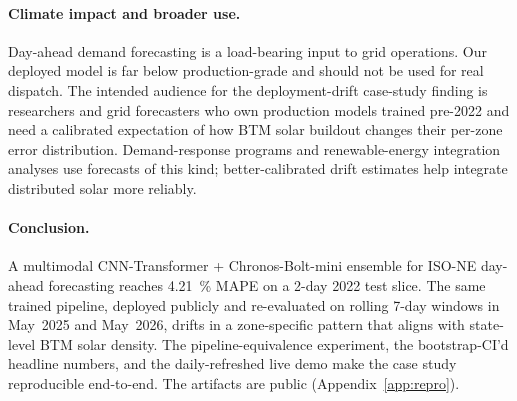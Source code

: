 \paragraph{Climate impact and broader use.}
Day-ahead demand forecasting is a load-bearing input to grid
operations. Our deployed model is far below production-grade and should
not be used for real dispatch. The intended audience for the
deployment-drift case-study finding is researchers and grid forecasters
who own production models trained pre-2022 and need a calibrated
expectation of how BTM solar buildout changes their per-zone error
distribution. Demand-response programs and renewable-energy integration
analyses use forecasts of this kind; better-calibrated drift estimates
help integrate distributed solar more reliably.

\paragraph{Conclusion.}
A multimodal CNN-Transformer + Chronos-Bolt-mini ensemble for ISO-NE
day-ahead forecasting reaches 4.21~\% MAPE on a 2-day 2022 test slice.
The same trained pipeline, deployed publicly and re-evaluated on
rolling 7-day windows in May~2025 and May~2026, drifts in a
zone-specific pattern that aligns with state-level BTM solar density.
The pipeline-equivalence experiment, the bootstrap-CI'd headline
numbers, and the daily-refreshed live demo make the case study
reproducible end-to-end. The artifacts are public
(Appendix~\ref{app:repro}).
